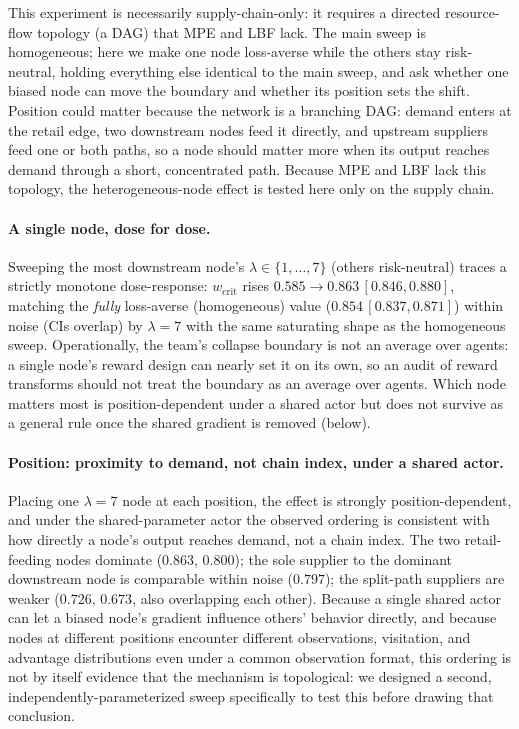 \documentclass[letterpaper]{article} %
\theoremstyle{plain}
\newcommand{\wcrit}{w_{\mathrm{crit}}}
\begin{document}
This experiment is necessarily supply-chain-only: it requires a directed resource-flow topology (a
DAG) that MPE and LBF lack. The main sweep is homogeneous; here we make one node loss-averse while
the others stay risk-neutral, holding everything else identical to the main sweep, and ask whether
one biased node can move the boundary and whether its position sets the shift. Position could matter
because the network is a branching DAG: demand
enters at the retail edge, two downstream nodes feed it directly, and upstream suppliers feed one or
both paths, so a node should matter more when its output reaches demand through a short, concentrated
path. Because MPE and LBF lack this topology, the heterogeneous-node effect is tested here only on
the supply chain.

\paragraph{A single node, dose for dose.}
Sweeping the most downstream node's $\lambda\in\{1,\dots,7\}$ (others risk-neutral) traces a strictly
monotone dose-response: $\wcrit$ rises $0.585\to0.863\,[0.846,0.880]$, matching the \emph{fully}
loss-averse (homogeneous) value ($0.854\,[0.837,0.871]$) within noise (CIs overlap) by $\lambda{=}7$
with the same saturating shape as the homogeneous sweep. Operationally, the
team's collapse boundary is not an average over agents: a single node's reward design can nearly set it
on its own, so an audit of reward transforms should not treat the boundary as an average over agents.
Which node matters most is position-dependent under a shared actor but does not survive as a general
rule once the shared gradient is removed (below).

\paragraph{Position: proximity to demand, not chain index, under a shared actor.}
Placing one $\lambda{=}7$ node at each position, the effect is strongly position-dependent, and under
the shared-parameter actor the observed ordering is consistent with how directly a node's output
reaches demand, not a chain index. The two
retail-feeding nodes dominate ($0.863$, $0.800$); the sole supplier to the dominant downstream node is
comparable within noise ($0.797$); the split-path suppliers are weaker ($0.726$, $0.673$, also
overlapping each other). Because a single shared actor can let a biased node's gradient influence
others' behavior directly, and because nodes at different positions encounter different observations,
visitation, and advantage distributions even under a common observation format, this ordering is not
by itself evidence that the mechanism is topological: we designed a second, independently-parameterized
sweep specifically to test this before drawing that conclusion.
\end{document}
